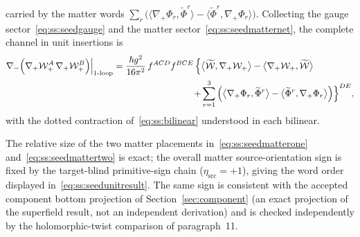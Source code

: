 carried by the matter words
$\sum_r\big(\langle\nabla_{+}\Phi_r,\widetilde\Phi^{r}\rangle
-\langle\widetilde\Phi^{r},\nabla_{+}\Phi_r\rangle\big)$. Collecting the
gauge sector~\eqref{eq:ss:seedgauge} and the matter
sector~\eqref{eq:ss:seedmatternet}, the complete channel in unit insertions
is
\begin{equation}\label{eq:ss:seedunitresult}
\begin{aligned}
\nabla_{-}\Big(\nabla_{+}\mathcal{W}_{+}^{A}\,\nabla_{+}\mathcal{W}_{+}^{B}\Big)
\Big|_{\text{1-loop}}
=\frac{\hbar g^{2}}{16\pi^{2}}\,f^{ACD}f^{BCE}\,
\Big\{&\big\langle\widetilde{\mathcal{W}},\nabla_{+}\mathcal{W}_{+}\big\rangle
-\big\langle\nabla_{+}\mathcal{W}_{+},\widetilde{\mathcal{W}}\big\rangle\\
+&\sum_{r=1}^{3}\Big(
\big\langle\nabla_{+}\Phi_r,\widetilde\Phi^{r}\big\rangle
-\big\langle\widetilde\Phi^{r},\nabla_{+}\Phi_r\big\rangle\Big)
\Big\}^{DE} ,
\end{aligned}
\end{equation}
with the dotted contraction of~\eqref{eq:ss:bilinear} understood in each
bilinear.

\begin{remark}\label{rem:ss:seedmatter}
The relative size of the two matter placements in~\eqref{eq:ss:seedmatterone}
and~\eqref{eq:ss:seedmattertwo} is exact; the overall matter
source-orientation sign is fixed by the target-blind primitive-sign chain
($\eta_{\mathrm{src}}=+1$), giving the word order displayed
in~\eqref{eq:ss:seedunitresult}. The same sign is consistent with the
accepted component bottom projection of Section~\ref{sec:component} (an exact
projection of the superfield result, not an independent derivation) and is
checked independently by the holomorphic-twist comparison of paragraph~11.
\end{remark}

